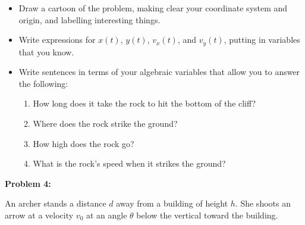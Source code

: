 \documentclass[12pt]{article}
\begin{document}
\begin{itemize}

\item Draw a cartoon of the problem, making clear your coordinate system and origin, and labelling interesting
things.

\vspace{1.2in}

\item Write expressions for $x(t)$, $y(t)$, $v_x(t)$, and $v_y(t)$, putting in variables that you know.

\vspace{1.2in}

\item Write sentences in terms of your algebraic variables that allow you to answer the following:


\begin{enumerate}
\item How long does it take the rock to hit the bottom of the cliff? 
\vspace{0.7in}
\item Where does the rock strike the ground?
\vspace{0.7in}
\item How high does the rock go?
\vspace{0.7in}
\item What is the rock's speed when it strikes the ground? 
\end{enumerate}
\end{itemize}
\newpage
{\large \bf Problem 4:}

An archer stands a distance $d$ away from a building of height $h$. She shoots an arrow at a velocity $v_0$
at an angle $\theta$ below the vertical toward the building.
\end{document}
